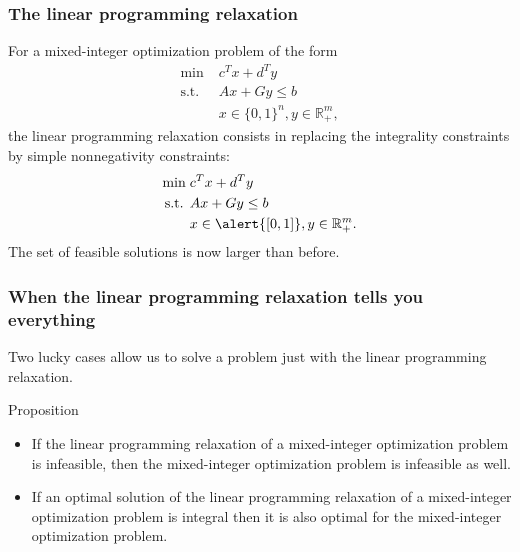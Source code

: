 \documentclass[9pt]{beamer}
\begin{document}
\begin{frame}
\frametitle{The linear programming relaxation}
For a mixed-integer optimization problem  of the form
\begin{align*}
\min \; & c^Tx+d^Ty\\
\text{s.t. } 
& Ax+Gy\leq b\\
&x\in \{0,1\}^n, y\in \mathbb R^m_+,
\end{align*}
the \alert{linear programming relaxation} consists in replacing the \alert{integrality constraints}
by simple \alert{nonnegativity constraints}:
\begin{align*}
\min \; & c^Tx+d^Ty\\
\text{s.t. } 
& Ax+Gy\leq b\\
&x\in \alert{[0,1]}, y\in \mathbb R^m_+.
\end{align*}
The set of \alert{feasible solutions} is now larger than before.
\end{frame}
\begin{frame}
\frametitle{When the linear programming relaxation tells you everything}
Two lucky cases allow us to solve a problem just with the linear programming relaxation.
\begin{block}{Proposition}
\begin{itemize}
\item<1-> If the linear programming relaxation of a mixed-integer optimization problem is \alert{infeasible},
then the mixed-integer optimization problem is \alert{infeasible} as well.\bigskip
\item<1-> If an optimal solution of the linear programming relaxation of a mixed-integer optimization problem is
\alert{integral} then it is also \alert{optimal } for the mixed-integer optimization problem.
\end{itemize}
\end{block}
\end{frame}
\end{document}
